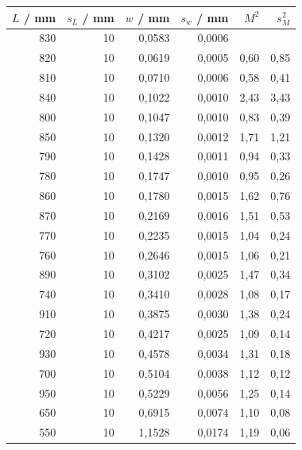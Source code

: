 \begin{table}
    \centering
    \begin{tabular}{rrrrrr}
        \toprule
        $L$ / mm &  $s_L$ / mm &    $w$ / mm &  $s_w$ / mm&     $M^2$ &        $s_M^2$ \\
        \midrule
        830 &  10 &  0,0583 &  0,0006 &       &      \\
        820 &  10 &  0,0619 &  0,0005 &  0,60 &  0,85 \\
        810 &  10 &  0,0710 &  0,0006 &  0,58 &  0,41 \\
        840 &  10 &  0,1022 &  0,0010 &  2,43 &  3,43 \\
        800 &  10 &  0,1047 &  0,0010 &  0,83 &  0,39 \\
        850 &  10 &  0,1320 &  0,0012 &  1,71 &  1,21 \\
        790 &  10 &  0,1428 &  0,0011 &  0,94 &  0,33 \\
        780 &  10 &  0,1747 &  0,0010 &  0,95 &  0,26 \\
        860 &  10 &  0,1780 &  0,0015 &  1,62 &  0,76 \\
        870 &  10 &  0,2169 &  0,0016 &  1,51 &  0,53 \\
        770 &  10 &  0,2235 &  0,0015 &  1,04 &  0,24 \\
        760 &  10 &  0,2646 &  0,0015 &  1,06 &  0,21 \\
        890 &  10 &  0,3102 &  0,0025 &  1,47 &  0,34 \\
        740 &  10 &  0,3410 &  0,0028 &  1,08 &  0,17 \\
        910 &  10 &  0,3875 &  0,0030 &  1,38 &  0,24 \\
        720 &  10 &  0,4217 &  0,0025 &  1,09 &  0,14 \\
        930 &  10 &  0,4578 &  0,0034 &  1,31 &  0,18 \\
        700 &  10 &  0,5104 &  0,0038 &  1,12 &  0,12 \\
        950 &  10 &  0,5229 &  0,0056 &  1,25 &  0,14 \\
        650 &  10 &  0,6915 &  0,0074 &  1,10 &  0,08 \\
        550 &  10 &  1,1528 &  0,0174 &  1,19 &  0,06 \\
        \bottomrule
    \end{tabular}
    \label{tab:M2}
\end{table}

